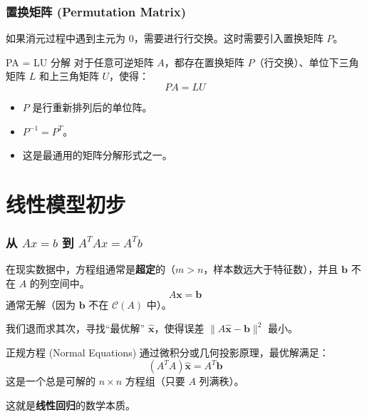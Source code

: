 \begin{frame}
\frametitle{置换矩阵 (Permutation Matrix)}

如果消元过程中遇到主元为 0，需要进行行交换。这时需要引入置换矩阵 $P$。

\begin{block}{PA = LU 分解}
对于任意可逆矩阵 $A$，都存在置换矩阵 $P$（行交换）、单位下三角矩阵 $L$ 和上三角矩阵 $U$，使得：
\[
PA = LU
\]
\end{block}

\begin{itemize}
    \item $P$ 是行重新排列后的单位阵。
    \item $P^{-1} = P^T$。
    \item 这是最通用的矩阵分解形式之一。
\end{itemize}

\end{frame}


\section{线性模型初步}


\begin{frame}
\frametitle{从 $Ax=b$ 到 $A^TAx = A^Tb$}

在现实数据中，方程组通常是\textbf{超定}的（$m > n$，样本数远大于特征数），并且 $\mathbf{b}$ 不在 $A$ 的列空间中。
\[
A\mathbf{x} = \mathbf{b}
\]
通常无解（因为 $\mathbf{b}$ 不在 $\mathcal{C}(A)$ 中）。

\pause

我们退而求其次，寻找“最优解” $\hat{\mathbf{x}}$，使得误差 $\|A\hat{\mathbf{x}} - \mathbf{b}\|^2$ 最小。

\begin{block}{正规方程 (Normal Equations)}
通过微积分或几何投影原理，最优解满足：
\[
(A^T A) \hat{\mathbf{x}} = A^T \mathbf{b}
\]
这是一个总是可解的 $n \times n$ 方程组（只要 $A$ 列满秩）。
\end{block}

这就是\textbf{线性回归}的数学本质。

\end{frame}


